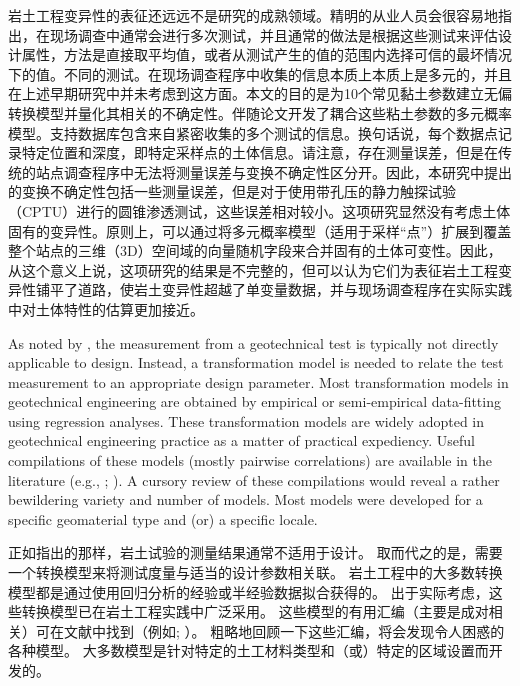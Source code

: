 \begin{paracol}{2}
    岩土工程变异性的表征还远远不是研究的成熟领域。精明的从业人员会很容易地指出，在现场调查中通常会进行多次测试，并且通常的做法是根据这些测试来评估设计属性，方法是直接取平均值，或者从测试产生的值的范围内选择可信的最坏情况下的值。不同的测试。在现场调查程序中收集的信息本质上本质上是多元的，并且在上述早期研究中并未考虑到这方面。本文的目的是为10个常见黏土参数建立无偏转换模型并量化其相关的不确定性。伴随论文\citep{Ching2014686}开发了耦合这些粘土参数的多元概率模型。支持数据库包含来自紧密收集的多个测试的信息。换句话说，每个数据点记录特定位置和深度，即特定采样点的土体信息。请注意，存在测量误差，但是在传统的站点调查程序中无法将测量误差与变换不确定性区分开。因此，本研究中提出的变换不确定性包括一些测量误差，但是对于使用带孔压的静力触探试验（CPTU）进行的圆锥渗透测试，这些误差相对较小\citep{Phoon1999612}。这项研究显然没有考虑土体固有的变异性。原则上，可以通过将多元概率模型（适用于采样“点”）扩展到覆盖整个站点的三维（3D）空间域的向量随机字段来合并固有的土体可变性。因此，从这个意义上说，这项研究的结果是不完整的，但可以认为它们为表征岩土工程变异性铺平了道路，使岩土变异性超越了单变量数据，并与现场调查程序在实际实践中对土体特性的估算更加接近。

    \switchcolumn*

    As noted by \citet{Phoon1999612}, the measurement from a geotechnical test is typically not directly applicable to design. Instead, a transformation model is needed to relate the test measurement to an appropriate design parameter. Most transformation models in geotechnical engineering are obtained by empirical or semi-empirical data-fitting using regression analyses. These transformation models are widely adopted in geotechnical engineering practice as a matter of practical expediency. Useful compilations of these models (mostly pairwise correlations) are available in the literature (e.g., \citealp{Kulhawy1990}; \citealp{Mayne2001}). A cursory review of these compilations would reveal a rather bewildering variety and number of models. Most models were developed for a specific geomaterial type and (or) a specific locale.

    \switchcolumn

    正如\citet{Phoon1999612}指出的那样，岩土试验的测量结果通常不适用于设计。 取而代之的是，需要一个转换模型来将测试度量与适当的设计参数相关联。 岩土工程中的大多数转换模型都是通过使用回归分析的经验或半经验数据拟合获得的。 出于实际考虑，这些转换模型已在岩土工程实践中广泛采用。 这些模型的有用汇编（主要是成对相关）可在文献中找到（例如\citealp{Kulhawy1990}; \citealp{Mayne2001}）。 粗略地回顾一下这些汇编，将会发现令人困惑的各种模型。 大多数模型是针对特定的土工材料类型和（或）特定的区域设置而开发的。


\end{paracol}
